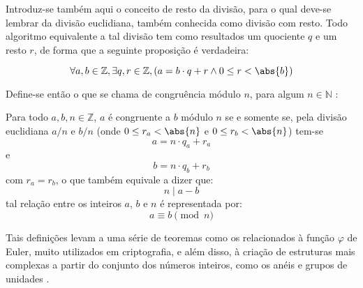 Introduz-se também aqui o conceito de resto da divisão, para o qual deve-se lembrar da divisão euclidiana, também conhecida como divisão com resto. Todo algoritmo equivalente a tal divisão tem como resultados um quociente $q$ e um resto $r$, de forma que a seguinte proposição é verdadeira:

\begin{equation*}
        \forall a, b \in \mathbb{Z}, \exists q, r \in \mathbb{Z}, (a = b \cdot q + r \land 0 \leq r < \abs{b})
\end{equation*}

Define-se então o que se chama de congruência módulo $n$, para algum $n \in \mathbb{N}$ \cite{book:2399854}:

\begin{definição}
    Para todo $a, b, n \in \mathbb{Z}$, $a$ é congruente a $b$ módulo $n$ se e somente se, pela divisão euclidiana $a/n$ e $b/n$ (onde $0 \leq r_a < \abs{n}$ e $0 \leq r_b < \abs{n}$) tem-se
    \begin{equation*}
        a = n \cdot q_a + r_a
    \end{equation*}
    e
    \begin{equation*}
        b = n \cdot q_b + r_b
    \end{equation*}
    com $r_a = r_b$, o que também equivale a dizer que:
    \begin{equation*}
        n \mid a - b
    \end{equation*}
    tal relação entre os inteiros $a$, $b$ e $n$ é representada por:
    \begin{equation*}
        a \equiv b \pmod{n}
    \end{equation*}
\end{definição}

Tais definições levam a uma série de teoremas como os relacionados à função $\varphi$ de Euler, muito utilizados em criptografia, e além disso, à criação de estruturas mais complexas a partir do conjunto dos números inteiros, como os anéis e grupos de unidades \cite{book:2399854}.


